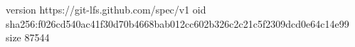 version https://git-lfs.github.com/spec/v1
oid sha256:f026cd540ac41f30d70b4668bab012cc602b326c2c21c5f2309dcd0e64c14e99
size 87544
